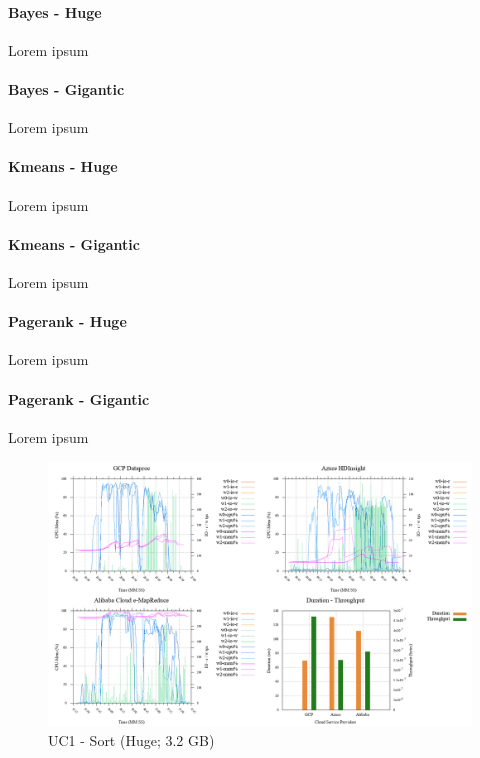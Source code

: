 \documentclass[review]{elsarticle}
\begin{document}
\paragraph{Bayes - Huge} Lorem ipsum

\paragraph{Bayes - Gigantic} Lorem ipsum

\paragraph{Kmeans - Huge} Lorem ipsum

\paragraph{Kmeans - Gigantic} Lorem ipsum

\paragraph{Pagerank - Huge} Lorem ipsum

\paragraph{Pagerank - Gigantic} Lorem ipsum

\begin{figure}[b]
	\caption{UC1 - Sort (Huge; 3.2 GB)}
	\includegraphics[width=\textwidth]{uc1-srt-h-cmidt}
	\centering
\end{figure}
\end{document}
